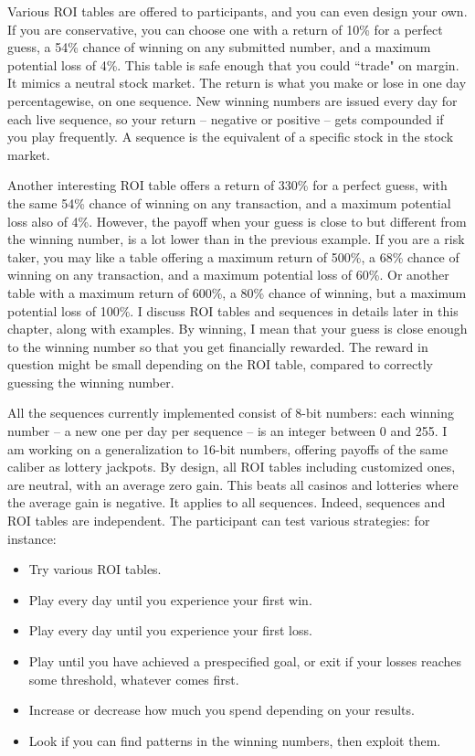 \documentclass[oneside,10pt]{book}
\begin{document}
Various ROI tables are offered to participants, and you can even design your own. If you are conservative, you can choose one with a return of 10\% for a perfect guess, a 54\% chance of winning on any submitted number, and a maximum potential loss of 4\%. This table is safe enough that you could ``trade" on margin. It mimics
 a neutral stock market. The return is what you make or lose in one day percentagewise, on one sequence. New winning numbers are issued every day for each live sequence, so your return -- negative or positive -- gets compounded if you play frequently.
 A sequence is the equivalent of a specific stock in the stock market.

Another interesting ROI table offers a return of 330\% for a perfect guess, with the same 54\% chance of winning on any transaction, and  a maximum potential loss also of 4\%. However, the payoff when your guess is close to but different from the winning number, is a lot lower than in the previous example. 
If you are a risk taker, you may like a table offering a maximum return of 500\%, a 68\% chance of winning on any transaction, and a maximum potential loss of 60\%. Or another table with a maximum return of 600\%, a 80\% chance of winning, but a maximum potential loss of 100\%.  I discuss ROI tables and sequences in details later in this chapter, along with examples. By winning, I mean that your guess is close enough to the winning number so that you get financially rewarded. The reward in question might be small depending on the ROI table, compared to correctly guessing the winning number. 

All the sequences currently implemented consist of 8-bit numbers: each winning number -- a new one per day per sequence -- is an integer between 0 and 255. I am working on a generalization to 16-bit numbers, offering payoffs of the same caliber as lottery jackpots. By design, all ROI tables including customized ones, are neutral, with an average zero gain. This beats all casinos and lotteries where the average gain is negative. It applies
 to all sequences. Indeed, sequences and ROI tables are independent. The participant can test various strategies: for instance:
\vspace{1ex}
\begin{itemize}
\item 	Try various ROI tables.
\item 	Play every day until you experience your first win.
\item 	Play every day until you experience your first loss.
\item 	Play until you have achieved a prespecified goal, or exit if your losses reaches some threshold, whatever comes first. 
\item 	Increase or decrease how much you spend depending on your results.
\item 	Look if you can find patterns in the winning numbers, then exploit them. 
\end{itemize}\vspace{1ex}
\end{document}
